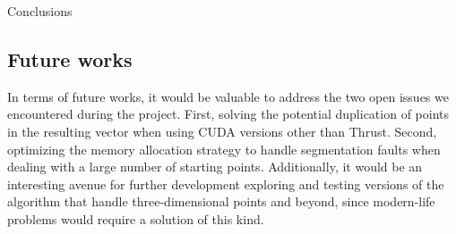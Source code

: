 \documentclass[a4paper,oneside,11pt,DIV12,headsepline,footexclude,headexclude]{scrartcl}
\begin{document}
\begin{section}{Conclusions}
\subsection{Future works}
In terms of future works, it would be valuable to address the two open issues we encountered during the project. First, solving the potential duplication of points in the resulting vector when using CUDA versions other than Thrust. Second, optimizing the memory allocation strategy to handle segmentation faults when dealing with a large number of starting points. Additionally, it would be an interesting avenue for further development exploring and testing versions of the algorithm that handle three-dimensional points and beyond, since modern-life problems would require a solution of this kind.
\end{section}
\end{document}
